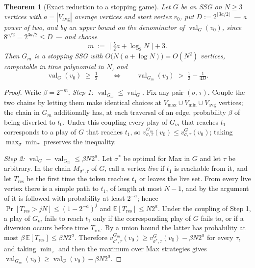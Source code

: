 \documentclass[11pt]{article}
\theoremstyle{plain}
\newtheorem{theorem}{Theorem}[section]
\theoremstyle{definition}
\DeclareMathOperator{\val}{val}
\newcommand{\Vmax}{V_{\max}}
\newcommand{\Vmin}{V_{\min}}
\newcommand{\Vavg}{V_{\mathrm{avg}}}
\begin{document}
\begin{theorem}[Exact reduction to a stopping game]\label{thm:stopping-transform}
Let $G$ be an SSG on $N\ge3$ vertices with $a=|\Vavg|$ average vertices
and start vertex $v_0$, put $D:=2^{\lceil 3a/2\rceil}$ --- a power of two,
and by  an upper bound on the denominator of
$\val_G(v_0)$, since $8^{a/2}=2^{3a/2}\le D$ --- and choose
\[
  m \;:=\; \bigl\lceil\, \tfrac52 a + \log_2 N \,\bigr\rceil + 3 .
\]
Then $G_m$ is a stopping SSG with $O\bigl(N(a+\log N)\bigr)=O(N^2)$ vertices, computable in time
polynomial in $N$, and
\[
  \val_G(v_0)\;\ge\;\tfrac12
  \qquad\Longleftrightarrow\qquad
  \val_{G_m}(v_0)\;>\;\tfrac12-\tfrac{1}{4D}.
\]
\end{theorem}

\begin{proof}
Write $\beta=2^{-m}$. \emph{Step 1: $\val_{G_m}\le\val_G$.} Fix any pair
$(\sigma,\tau)$. Couple the two chains by letting them make identical
choices at $\Vmax\cup\Vmin\cup\Vavg$ vertices; the chain in $G_m$
additionally has, at each traversal of an edge, probability $\beta$ of
being diverted to $t_0$. Under this coupling every play of $G_m$ that
reaches $t_1$ corresponds to a play of $G$ that reaches $t_1$, so
$v^{G_m}_{\sigma,\tau}(v_0)\le v^{G}_{\sigma,\tau}(v_0)$; taking
$\max_\sigma\min_\tau$ preserves the inequality.

\emph{Step 2: $\val_G-\val_{G_m}\le\beta N2^{a}$.} Let $\sigma^\ast$ be
optimal for Max in $G$ and let $\tau$ be arbitrary. In the chain
$M_{\sigma^\ast,\tau}$ of $G$, call a vertex \emph{live} if $t_1$ is
reachable from it, and let $T_{\mathrm{res}}$ be the first time the token
reaches $t_1$ or leaves the live set. From every live vertex there is a
simple path to $t_1$, of length at most $N-1$, and by the argument of
 it is followed with probability at least $2^{-a}$;
hence $\Pr[T_{\mathrm{res}}>jN]\le(1-2^{-a})^{j}$ and
$\mathbb{E}[T_{\mathrm{res}}]\le N2^{a}$. Under the coupling of Step 1, a
play of $G_m$ fails to reach $t_1$ only if the corresponding play of $G$
fails to, or if a diversion occurs before time $T_{\mathrm{res}}$. By a
union bound the latter has probability at most
$\beta\,\mathbb{E}[T_{\mathrm{res}}]\le\beta N2^{a}$. Therefore
$v^{G_m}_{\sigma^\ast,\tau}(v_0)\ge v^{G}_{\sigma^\ast,\tau}(v_0)-\beta N2^{a}$
for every $\tau$, and taking $\min_\tau$ and then the maximum over Max
strategies gives $\val_{G_m}(v_0)\ge\val_G(v_0)-\beta N2^{a}$.


\end{proof}
\end{document}
